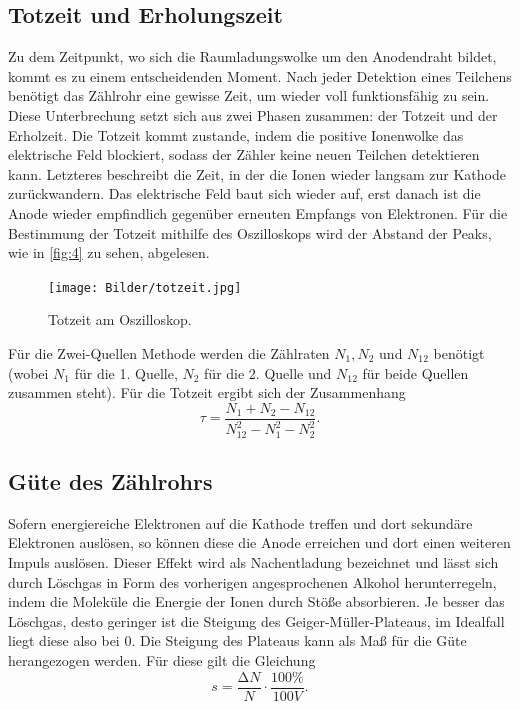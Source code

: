 \subsection{Totzeit und Erholungszeit}
Zu dem Zeitpunkt, wo sich die Raumladungswolke um den Anodendraht bildet, kommt 
es zu einem entscheidenden Moment. Nach jeder Detektion eines Teilchens benötigt
das Zählrohr eine gewisse Zeit, um wieder voll funktionsfähig zu sein. Diese
Unterbrechung setzt sich aus zwei Phasen zusammen: der Totzeit und der Erholzeit.
Die Totzeit kommt zustande, indem die positive Ionenwolke das elektrische Feld 
blockiert, sodass der Zähler keine neuen Teilchen detektieren kann. Letzteres 
beschreibt die Zeit, in der die Ionen wieder langsam zur Kathode zurückwandern. 
Das elektrische Feld baut sich wieder auf, erst danach ist die Anode wieder 
empfindlich gegenüber erneuten Empfangs von Elektronen. Für die Bestimmung der 
Totzeit mithilfe des Oszilloskops wird der Abstand der Peaks, wie in \autoref{fig:4}
zu sehen, abgelesen.
\begin{figure}[H]
    \centering
        \centering
        \texttt{[image: Bilder/totzeit.jpg]}
        \caption{Totzeit am Oszilloskop.}
    \hfill
    \label{fig:3}
\end{figure}
\noindent Für die Zwei-Quellen Methode werden die Zählraten $N_1, N_2$ und 
$N_{12}$ benötigt (wobei $N_1$ für die 1. Quelle, $N_2$ für die 2. Quelle und 
$N_{12}$ für beide Quellen zusammen steht). Für die Totzeit ergibt sich der 
Zusammenhang
\begin{equation}
    \tau = \frac{N_1 + N_2 - N_{12}}{N_{12}^2 - N_1^2 -N_2^2}.
\end{equation}

\subsection{Güte des Zählrohrs}
Sofern energiereiche Elektronen auf die Kathode treffen und dort sekundäre 
Elektronen auslösen, so können diese die Anode erreichen und dort einen 
weiteren Impuls auslösen. Dieser Effekt wird als Nachentladung bezeichnet und 
lässt sich durch Löschgas in Form des vorherigen angesprochenen Alkohol 
herunterregeln, indem die Moleküle die Energie der Ionen durch Stöße absorbieren.
Je besser das Löschgas, desto geringer ist die Steigung des Geiger-Müller-Plateaus, 
im Idealfall liegt diese also bei 0. Die Steigung des Plateaus kann als Maß 
für die Güte herangezogen werden. Für diese gilt die Gleichung 
\begin{equation}
    s= \frac{\increment N}{N} \cdot \frac{100\%}{100V}.
\end{equation}

